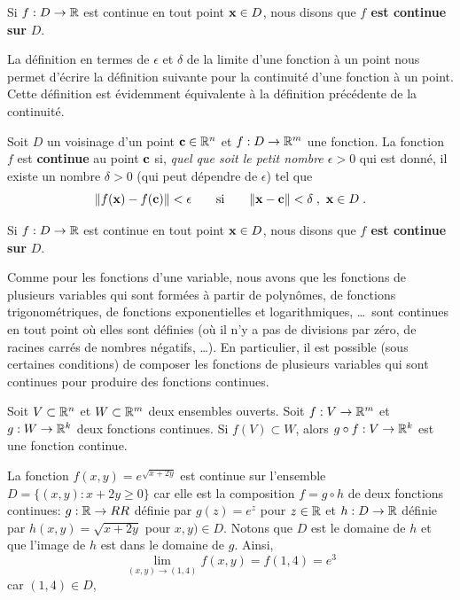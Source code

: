 {\begin{focus}{\dfn}
Si $f:D\rightarrow \mathbb{R}$ est continue en tout point $\mathbf{x} \in D$,
nous disons que {\bfseries $f$ est continue sur} $D$.
\end{focus}

La définition en termes de $\epsilon$ et $\delta$ de la limite d'une
fonction à un point nous permet d'écrire la définition suivante pour
la continuité d'une fonction à un point.  Cette définition est
évidemment équivalente à la définition précédente de la continuité.

\begin{focus}[\theory]{\dfn} 
Soit $D$ un voisinage d'un point $\mathbf{c} \in \mathbb{R}^n$ et
$f:D\rightarrow \mathbb{R}^m$ une fonction.  La fonction $f$ est
{\bfseries continue} au point $\mathbf{c}$ si,
{\em quel que soit le petit nombre $\epsilon >0$} qui est donné, il
existe un nombre $\delta >0$ (qui peut dépendre de $\epsilon$)
tel que
\[
\|f(\mathbf{x}) - f(\mathbf{c})\| < \epsilon \qquad \text{si} \qquad
\|\mathbf{x}-\mathbf{c}\|<\delta \; ,\ \mathbf{x} \in D \; .
\]

Si $f:D\rightarrow \mathbb{R}$ est continue en tout point $\mathbf{x} \in D$,
nous disons que {\bfseries $f$ est continue sur} $D$.
\end{focus}

Comme pour les fonctions d'une variable, nous avons que les fonctions de
plusieurs variables qui sont formées à partir de polynômes, de
fonctions trigonométriques, de fonctions exponentielles et
logarithmiques, \ldots\ sont continues en tout point où elles sont
définies (où il n'y a pas de divisions par zéro, de racines carrés de
nombres négatifs, \ldots).  En particulier, il est possible (sous
certaines conditions) de composer les fonctions de plusieurs variables
qui sont continues pour produire des fonctions continues.

\begin{focus}{\thm}
Soit $V \subset \mathbb{R}^n$ et $W \subset \mathbb{R}^m$ deux ensembles ouverts.
Soit $f:V\rightarrow \mathbb{R}^m$ et $g:W\rightarrow \mathbb{R}^k$ deux fonctions
continues.  Si $f(V) \subset W$, alors $g\circ f:V\rightarrow \mathbb{R}^k$
est une fonction continue.
\end{focus}

\begin{egg}
La fonction $f(x,y) = e^{\sqrt{x+2y}}$ est continue sur l'ensemble
$D = \{ (x,y) : x+2y \geq 0 \}$ car elle est la composition
$f = g\circ h$ de deux fonctions continues: $g:\mathbb{R} \to \\RR$ définie par
$g(z) = e^z$ pour $z\in \mathbb{R}$ et $h:D \to \mathbb{R}$ définie par
$h(x,y) = \sqrt{x+2y}$ pour $x,y) \in D$.  Notons que
$D$ est le domaine de $h$ et que l'image de $h$ est dans le domaine de
$g$.  Ainsi,
\[
\lim_{(x,y)\rightarrow (1,4)} f(x,y) = f(1,4) = e^3
\]
car $(1,4)\in D$,
\end{egg}

}
